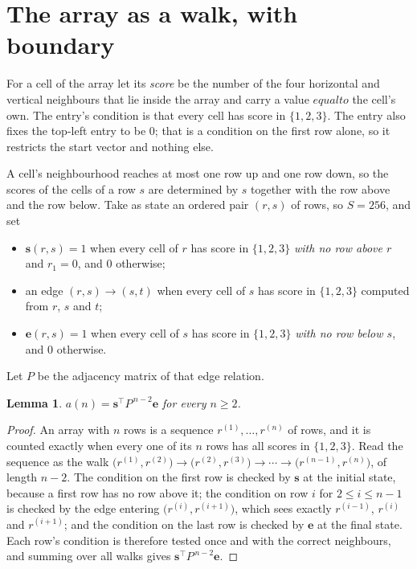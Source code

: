 \documentclass[11pt,a4paper]{article}
\theoremstyle{plain}
\newtheorem{lemma}[theorem]{Lemma}
\theoremstyle{definition}
\begin{document}
\section{The array as a walk, with boundary}

For a cell of the array let its \emph{score} be the number of the four horizontal and vertical neighbours that lie inside
the array and carry a value $equal to$ the cell's own. The entry's condition is that every cell
has score in $\{1,2,3\}$. The entry also fixes the top-left entry to be $0$; that is a condition on the first row alone, so it restricts the start vector and nothing else.

A cell's neighbourhood reaches at most one row up and one row down, so the scores of the
cells of a row $s$ are determined by $s$ together with the row above and the row below.
Take as state an ordered pair $(r,s)$ of rows, so $S=256$, and set
\begin{itemize}
\item $\mathbf{s}(r,s)=1$ when every cell of $r$ has score in $\{1,2,3\}$ \emph{with no row
above $r$} and $r_1=0$, and $0$ otherwise;
\item an edge $(r,s)\to(s,t)$ when every cell of $s$ has score in $\{1,2,3\}$ computed from
$r$, $s$ and $t$;
\item $\mathbf{e}(r,s)=1$ when every cell of $s$ has score in $\{1,2,3\}$ \emph{with no row
below $s$}, and $0$ otherwise.
\end{itemize}
Let $P$ be the adjacency matrix of that edge relation.

\begin{lemma}\label{lem:walk}
$a(n)=\mathbf{s}^{\!\top}P^{\,n-2}\mathbf{e}$ for every $n\ge2$.
\end{lemma}

\begin{proof}
An array with $n$ rows is a sequence $r^{(1)},\dots,r^{(n)}$ of rows, and it is counted
exactly when every one of its $n$ rows has all scores in $\{1,2,3\}$. Read the sequence as the
walk $\bigl(r^{(1)},r^{(2)}\bigr)\to\bigl(r^{(2)},r^{(3)}\bigr)\to\cdots\to
\bigl(r^{(n-1)},r^{(n)}\bigr)$, of length $n-2$. The condition on the first row is
checked by $\mathbf{s}$ at the initial state, because a first row has no row above it; the
condition on row $i$ for $2\le i\le n-1$ is checked by the edge entering
$\bigl(r^{(i)},r^{(i+1)}\bigr)$, which sees exactly $r^{(i-1)}$, $r^{(i)}$ and
$r^{(i+1)}$; and the condition on the last row is checked by $\mathbf{e}$ at the final
state. Each row's condition is therefore tested once and with the correct neighbours, and
summing over all walks gives $\mathbf{s}^{\!\top}P^{\,n-2}\mathbf{e}$.
\end{proof}
\end{document}
